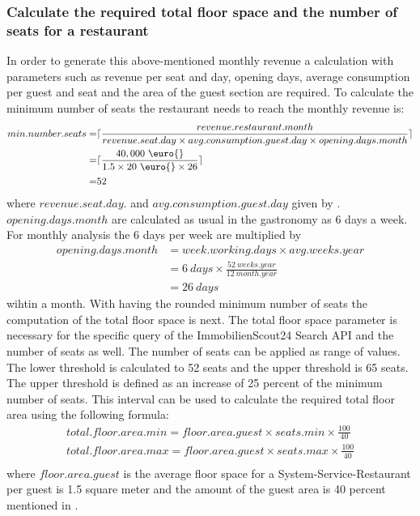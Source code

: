 \subsubsection{Calculate the required total floor space and the number of seats for a restaurant}
In order to generate this above-mentioned monthly revenue a calculation with parameters such as revenue per seat and day,
 opening days, average consumption per guest and seat and the area of the guest section are required. To calculate the
 minimum number of seats the restaurant needs to reach the monthly revenue is:
\begin{equation}
\begin{aligned}
	min.number.seats =&\lceil\frac{revenue.restaurant.month}{revenue.seat.day \times avg.consumption.guest.day \times opening.days.month}\rceil \\
	=&\lceil\frac{40,000 \ \text{\euro{}} }{1.5 \times 20 \ \text{\euro{}} \times 26}\rceil \\
	=&52
\end{aligned}
\label{eq:number_seats_benchmark}
\end{equation}
where $revenue.seat.day.$ and $avg.consumption.guest.day$ given by \cite{BenchmarkGastronomie}. $opening.days.month$
 are calculated as usual in the gastronomy as 6 days a week. For monthly analysis the 6 days per week are multiplied by
\begin{equation}
    \begin{aligned}
        opening.days.month & = week.working.days \times avg.weeks.year \\
        & = 6 \ days \times \frac{52 \ weeks.year}{12 \ month.year} \\
        & = 26 \ days
    \end{aligned}
    \label{eq:opening_days}
\end{equation}
wihtin a month.\newline
With having the rounded minimum number of seats the computation of the total floor space is next. The total
 floor space parameter is necessary for the specific query of the ImmobilienScout24 Search API \cite{ImmoScout} and
 the number of seats as well. The number of seats can be applied as range of values. The lower threshold is calculated to 52 seats and
 the upper threshold is 65 seats. The upper threshold is defined as an increase of 25 percent of the minimum number of seats.
 This interval can be used to calculate the required total floor area using the following formula:
\begin{equation}
    \begin{aligned}
        total.floor.area.min = floor.area.guest \times seats.min \times \frac{100}{40} \\
        total.floor.area.max = floor.area.guest \times seats.max \times \frac{100}{40} \\
    \end{aligned}
    \label{eq:total_floor_space}
\end{equation}
where $floor.area.guest$ is the average floor space for a System-Service-Restaurant per guest is 1.5 square meter \cite{FlaecheGast} and the
 amount of the guest area is 40 percent mentioned in \cite{FlaecheGastronomie}.
